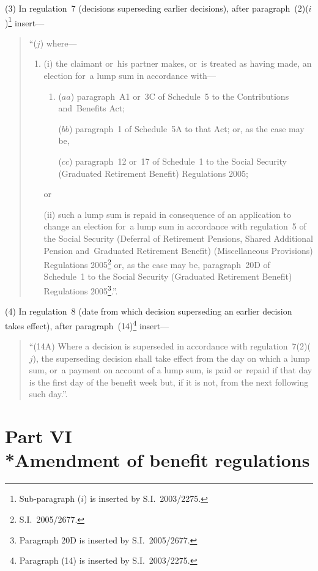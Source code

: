 \documentclass[12pt,a4paper]{article}
\begin{document}
(3) In regulation~7 (decisions superseding earlier decisions), after paragraph~(2)($i$)\footnote{Sub-paragraph ($i$) is inserted by S.I.~2003/2275.} insert—
\begin{quotation}
“($j$) where—
\begin{enumerate}\item[]
(i) the claimant or~his partner makes, or~is treated as having made, an election for~a lump sum in accordance with—
\begin{enumerate}\item[]
($aa$) paragraph~A1 or~3C of Schedule~5 to the Contributions and~Benefits Act;

($bb$) paragraph~1 of Schedule~5A to that Act; or, as the case may be,

($cc$)  paragraph~12 or~17 of Schedule~1 to the Social Security (Graduated Retirement Benefit) Regulations 2005;
\end{enumerate}
or

(ii) such a lump sum is repaid in consequence of an application to change an election for~a lump sum in accordance with regulation~5 of the Social Security (Deferral of Retirement Pensions, Shared Additional Pension and~Graduated Retirement Benefit) (Miscellaneous Provisions) Regulations 2005\footnote{S.I.~2005/2677.} or, as the case may be, paragraph~20D of Schedule~1 to the Social Security (Graduated Retirement Benefit) Regulations 2005\footnote{Paragraph 20D is inserted by S.I.~2005/2677.}.”.
\end{enumerate}
\end{quotation}

(4) In regulation~8 (date from which decision superseding an earlier decision takes effect), after paragraph~(14)\footnote{Paragraph (14) is inserted by S.I.~2003/2275.} insert—
\begin{quotation}
“(14A) Where a decision is superseded in accordance with regulation~7(2)($j$), the superseding decision shall take effect from the day on which a lump sum, or~a payment on account of a lump sum, is paid or~repaid if that day is the first day of the benefit week but, if it is not, from the next following such day.”.
\end{quotation}

\section[Part VI --- Amendment of benefit regulations]{Part VI\\*Amendment of benefit regulations}
\end{document}
